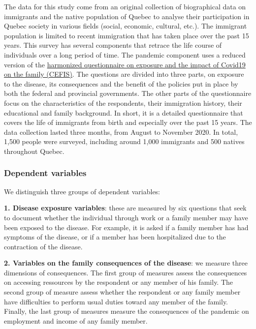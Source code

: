 \documentclass[
]{article}
\begin{document}
The data for this study come from an original collection of biographical data on
immigrants and the native population of Quebec to analyse their participation in
Quebec society in various fields (social, economic, cultural, etc.). The
immigrant population is limited to recent immigration that has taken place over
the past 15 years. This survey has several components that retrace the life
course of individuals over a long period of time. The pandemic component uses a
reduced version of the \href{https://www.phenxtoolkit.org/toolkit_content/PDF/CPTS_CEFIS_FullSurveyEng.pdf}{harmonized questionnaire on exposure and the impact of
Covid19 on the family
(CEFIS)}.
The questions are divided into three parts, on exposure to the disease, its
consequences and the benefit of the policies put in place by both the federal
and provincial governments. The other parts of the questionnaire focus on the
characteristics of the respondents, their immigration history, their educational
and family background. In short, it is a detailed questionnaire that covers the
life of immigrants from birth and especially over the past 15 years. The data
collection lasted three months, from August to November 2020. In total, 1,500
people were surveyed, including around 1,000 immigrants and 500 natives
throughout Quebec.

\hypertarget{dependent-variables}{%
\subsubsection{Dependent variables}\label{dependent-variables}}

We distinguish three groups of dependent variables:

\textbf{1. Disease exposure variables}: these are measured by six questions that seek
to document whether the individual through work or a family member may have been
exposed to the disease. For example, it is asked if a family member has had
symptoms of the disease, or if a member has been hospitalized due to the
contraction of the disease.

\textbf{2. Variables on the family consequences of the disease}: we measure three
dimensions of consequences. The first group of measures assess the consequences
on accessing ressources by the respondent or any member of his family. The
second group of measure assess whether the respondent or any family member have
difficulties to perform usual duties toward any member of the family. Finally,
the last group of measures measure the consequences of the pandemic on
employment and income of any family member.
\end{document}
